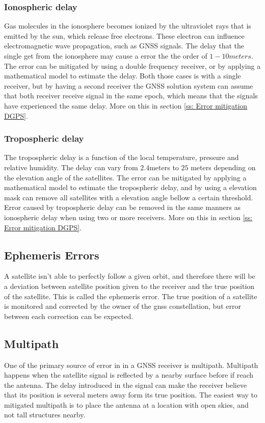 \subsubsection{Ionospheric delay}
Gas molecules in the ionosphere becomes ionized by the ultraviolet rays that is emitted by the sun, which release free electrons. These electron can influence electromagnetic wave propagation, such as GNSS signals. The delay that the single get from the ionosphere may cause a error the the order of $1-10 meters$. The error can be mitigated by using a double frequency receiver, or by applying a mathematical model to estimate the delay. Both those cases is with a single receiver, but by having a second receiver the GNSS solution system can assume that both receiver receive signal in the same epoch, which means that the signals have experienced the same delay. More on this in section \ref{ss: Error mitigation DGPS}.

\subsubsection{Tropospheric delay}
The tropospheric delay is a function of the local temperature, pressure and relative humidity. The delay can vary from $2.4$meters to $25$ meters depending on the elevation angle of the satellites. The error can be mitigated by applying a mathematical model to estimate the tropospheric delay, and by using a elevation mask can remove all satellites with a elevation angle bellow a certain threshold. Error caused by tropospheric delay can be removed in the same manners as ionospheric delay when using two or more receivers. More on this in section \ref{ss: Error mitigation DGPS}.

\subsection{Ephemeris Errors}
A satellite isn't able to perfectly follow a given orbit, and therefore there will be a deviation between satellite position given to the receiver and the true position of the satellite. This is called the ephemeris error. The true position of a satellite is monitored and corrected by the owner of the \gls{gnss} constellation, but error between each correction can be expected.
\subsection{Multipath}
One of the primary source of error in in a GNSS receiver is multipath. Multipath happens when the satellite signal is reflected by a nearby surface before if reach the antenna. The delay introduced in the signal can make the receiver believe that its position is several meters away form its true position. The easiest way to mitigated multipath is to place the antenna at a location with open skies, and not tall structures nearby.
